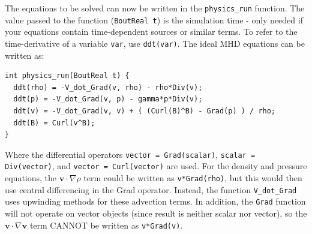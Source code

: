 \documentclass[12pt]{article}
\newcommand{\code}[1]{\texttt{#1}}
\begin{document}
The equations to be solved can now be written in the \code{physics\_run} function. The value
passed to the function (\code{BoutReal t}) is the simulation time - only needed if your
equations contain time-dependent sources or similar terms. To refer to the time-derivative
of a variable \code{var}, use \code{ddt(var)}. The ideal MHD equations can be written as:
\begin{lstlisting}
int physics_run(BoutReal t) {
  ddt(rho) = -V_dot_Grad(v, rho) - rho*Div(v);
  ddt(p) = -V_dot_Grad(v, p) - gamma*p*Div(v);
  ddt(v) = -V_dot_Grad(v, v) + ( (Curl(B)^B) - Grad(p) ) / rho;
  ddt(B) = Curl(v^B);
}
\end{lstlisting}
Where the differential operators \code{vector = Grad(scalar)}, \code{scalar = Div(vector)}, and
\code{vector = Curl(vector)} are used. For the density and pressure equations, 
the $\mathbf{v}\cdot\nabla\rho$ term could be written as \code{v*Grad(rho)}, but this would then use
central differencing in the Grad operator. Instead, the function \code{V\_dot\_Grad} uses upwinding
methods for these advection terms. In addition, the \code{Grad} function will not operate
on vector objects (since result is neither scalar nor vector), so the $\mathbf{v}\cdot\nabla\mathbf{v}$ term CANNOT be written as \code{v*Grad(v)}. 
\end{document}
